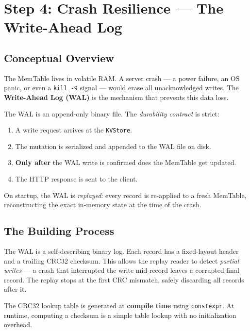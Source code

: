 \documentclass[11pt,a4paper]{article}
\begin{document}
\section{Step 4: Crash Resilience --- The Write-Ahead Log}
\label{sec:wal}

\subsection{Conceptual Overview}

The MemTable lives in volatile RAM. A server crash --- a power failure, an
OS panic, or even a \texttt{kill -9} signal --- would erase all
unacknowledged writes. The \textbf{Write-Ahead Log (WAL)} is the mechanism that
prevents this data loss.

The WAL is an append-only binary file. The \emph{durability contract} is strict:
\begin{enumerate}[noitemsep]
    \item A write request arrives at the \texttt{KVStore}.
    \item The mutation is serialized and appended to the WAL file on disk.
    \item \textbf{Only after} the WAL write is confirmed does the MemTable get updated.
    \item The HTTP response is sent to the client.
\end{enumerate}
On startup, the WAL is \emph{replayed}: every record is re-applied to a fresh
MemTable, reconstructing the exact in-memory state at the time of the crash.

\subsection{The Building Process}

The WAL is a self-describing binary log. Each record has a fixed-layout header
and a trailing CRC32 checksum. This allows the replay reader to detect
\emph{partial writes} --- a crash that interrupted the write mid-record leaves
a corrupted final record. The replay stops at the first CRC mismatch, safely
discarding all records after it.

The CRC32 lookup table is generated at \textbf{compile time} using
\texttt{constexpr}. At runtime, computing a checksum is a simple table lookup
with no initialization overhead.
\end{document}
